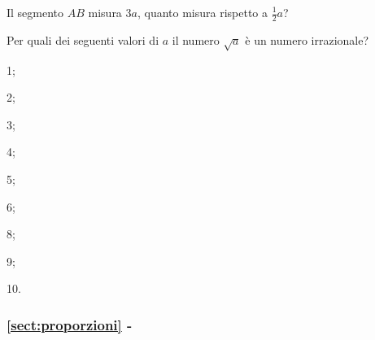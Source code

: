\begin{esercizio}
\label{ese:6.11}
Il segmento \(AB\) misura \(3a\), quanto misura rispetto a 
\(\frac{1}{2}a\)? 
\end{esercizio}

\begin{esercizio}
\label{ese:6.12}
Per quali dei seguenti valori di \(a\) il numero \(\sqrt{a}\) è un numero 
irrazionale?
\begin{multicols}{5}
\begin{enumeratea}
\item 1;
\item 2;
\item 3;
\item 4;
\item 5;
\item 6;
\item 8;
\item 9;
\item 10.
\end{enumeratea}
\end{multicols}
\end{esercizio}

\begingroup
\hypersetup{linkcolor=black}
\subsubsection*{\ref{sect:proporzioni} - }
\endgroup

